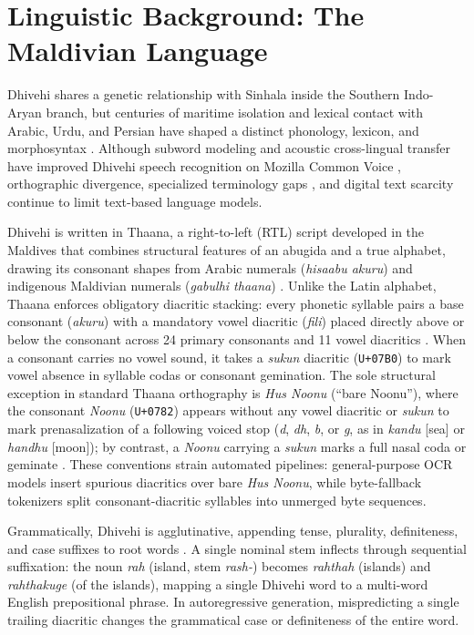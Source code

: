 \documentclass[acmsmall,review,anonymous]{acmart}
\begin{document}
\section{Linguistic Background: The Maldivian Language}
Dhivehi shares a genetic relationship with Sinhala inside the Southern Indo-Aryan branch, but centuries of maritime isolation and lexical contact with Arabic, Urdu, and Persian have shaped a distinct phonology, lexicon, and morphosyntax \cite{fritz_dhivehi_2002, gnanadesikan_dhivehi_2017}. Although subword modeling and acoustic cross-lingual transfer have improved Dhivehi speech recognition on Mozilla Common Voice \cite{ardila_common_2020, ahmed_improving_2023}, orthographic divergence, specialized terminology gaps \cite{zahir_expanding_2024}, and digital text scarcity continue to limit text-based language models. 

Dhivehi is written in Thaana, a right-to-left (RTL) script developed in the Maldives that combines structural features of an abugida and a true alphabet, drawing its consonant shapes from Arabic numerals (\textit{hisaabu akuru}) and indigenous Maldivian numerals (\textit{gabulhi thaana}) \cite{gair_divehi_1996, gnanadesikan_dhivehi_2017}. Unlike the Latin alphabet, Thaana enforces obligatory diacritic stacking: every phonetic syllable pairs a base consonant (\textit{akuru}) with a mandatory vowel diacritic (\textit{fili}) placed directly above or below the consonant across 24 primary consonants and 11 vowel diacritics \cite{gnanadesikan_dhivehi_2017}. When a consonant carries no vowel sound, it takes a \textit{sukun} diacritic (\texttt{U+07B0}) to mark vowel absence in syllable codas or consonant gemination. The sole structural exception in standard Thaana orthography is \textit{Hus Noonu} (``bare Noonu''), where the consonant \textit{Noonu} (\texttt{U+0782}) appears without any vowel diacritic or \textit{sukun} to mark prenasalization of a following voiced stop (\textit{d}, \textit{dh}, \textit{b}, or \textit{g}, as in \textit{kandu} [sea] or \textit{handhu} [moon]); by contrast, a \textit{Noonu} carrying a \textit{sukun} marks a full nasal coda or geminate \cite{gair_divehi_1996, gnanadesikan_dhivehi_2017}. These conventions strain automated pipelines: general-purpose OCR models insert spurious diacritics over bare \textit{Hus Noonu}, while byte-fallback tokenizers split consonant-diacritic syllables into unmerged byte sequences.

Grammatically, Dhivehi is agglutinative, appending tense, plurality, definiteness, and case suffixes to root words \cite{fritz_dhivehi_2002, gnanadesikan_dhivehi_2017}. A single nominal stem inflects through sequential suffixation: the noun \textit{rah} (island, stem \textit{rash-}) becomes \textit{rahthah} (islands) and \textit{rahthakuge} (of the islands), mapping a single Dhivehi word to a multi-word English prepositional phrase. In autoregressive generation, mispredicting a single trailing diacritic changes the grammatical case or definiteness of the entire word.
\end{document}
